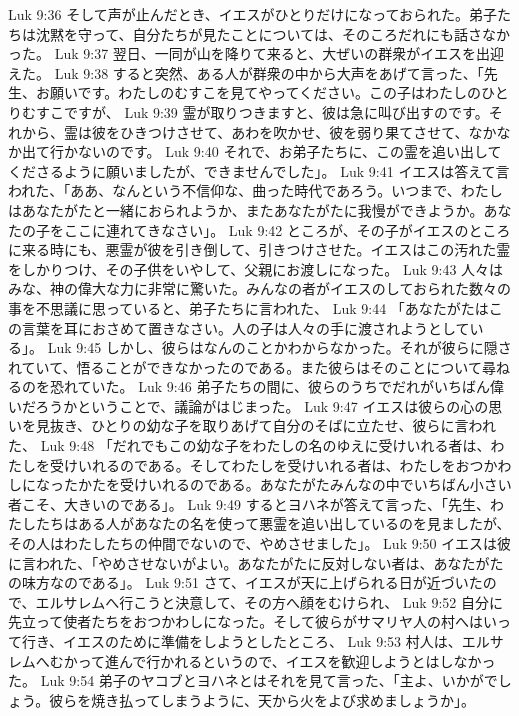 Luk 9:36  そして声が止んだとき、イエスがひとりだけになっておられた。弟子たちは沈黙を守って、自分たちが見たことについては、そのころだれにも話さなかった。
Luk 9:37  翌日、一同が山を降りて来ると、大ぜいの群衆がイエスを出迎えた。
Luk 9:38  すると突然、ある人が群衆の中から大声をあげて言った、「先生、お願いです。わたしのむすこを見てやってください。この子はわたしのひとりむすこですが、
Luk 9:39  霊が取りつきますと、彼は急に叫び出すのです。それから、霊は彼をひきつけさせて、あわを吹かせ、彼を弱り果てさせて、なかなか出て行かないのです。
Luk 9:40  それで、お弟子たちに、この霊を追い出してくださるように願いましたが、できませんでした」。
Luk 9:41  イエスは答えて言われた、「ああ、なんという不信仰な、曲った時代であろう。いつまで、わたしはあなたがたと一緒におられようか、またあなたがたに我慢ができようか。あなたの子をここに連れてきなさい」。
Luk 9:42  ところが、その子がイエスのところに来る時にも、悪霊が彼を引き倒して、引きつけさせた。イエスはこの汚れた霊をしかりつけ、その子供をいやして、父親にお渡しになった。
Luk 9:43  人々はみな、神の偉大な力に非常に驚いた。みんなの者がイエスのしておられた数々の事を不思議に思っていると、弟子たちに言われた、
Luk 9:44  「あなたがたはこの言葉を耳におさめて置きなさい。人の子は人々の手に渡されようとしている」。
Luk 9:45  しかし、彼らはなんのことかわからなかった。それが彼らに隠されていて、悟ることができなかったのである。また彼らはそのことについて尋ねるのを恐れていた。
Luk 9:46  弟子たちの間に、彼らのうちでだれがいちばん偉いだろうかということで、議論がはじまった。
Luk 9:47  イエスは彼らの心の思いを見抜き、ひとりの幼な子を取りあげて自分のそばに立たせ、彼らに言われた、
Luk 9:48  「だれでもこの幼な子をわたしの名のゆえに受けいれる者は、わたしを受けいれるのである。そしてわたしを受けいれる者は、わたしをおつかわしになったかたを受けいれるのである。あなたがたみんなの中でいちばん小さい者こそ、大きいのである」。
Luk 9:49  するとヨハネが答えて言った、「先生、わたしたちはある人があなたの名を使って悪霊を追い出しているのを見ましたが、その人はわたしたちの仲間でないので、やめさせました」。
Luk 9:50  イエスは彼に言われた、「やめさせないがよい。あなたがたに反対しない者は、あなたがたの味方なのである」。
Luk 9:51  さて、イエスが天に上げられる日が近づいたので、エルサレムへ行こうと決意して、その方へ顔をむけられ、
Luk 9:52  自分に先立って使者たちをおつかわしになった。そして彼らがサマリヤ人の村へはいって行き、イエスのために準備をしようとしたところ、
Luk 9:53  村人は、エルサレムへむかって進んで行かれるというので、イエスを歓迎しようとはしなかった。
Luk 9:54  弟子のヤコブとヨハネとはそれを見て言った、「主よ、いかがでしょう。彼らを焼き払ってしまうように、天から火をよび求めましょうか」。
